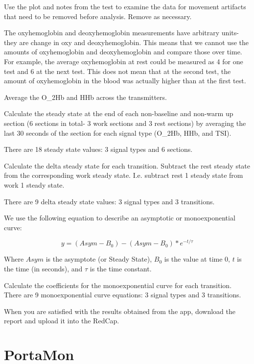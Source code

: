\documentclass[
]{book}
\begin{document}
Use the plot and notes from the test to examine the data for movement artifacts that need to be removed before analysis. Remove as necessary.

The oxyhemoglobin and deoxyhemoglobin measurements have arbitrary units- they are change in oxy and deoxyhemoglobin. This means that we cannot use the amounts of oxyhemoglobin and deoxyhemoglobin and compare those over time. For example, the average oxyhemoglobin at rest could be measured as 4 for one test and 6 at the next test. This does not mean that at the second test, the amount of oxyhemoglobin in the blood was actually higher than at the first test.

Average the O\_2Hb and HHb across the transmitters.

Calculate the steady state at the end of each non-baseline and non-warm up section (6 sections in total- 3 work sections and 3 rest sections) by averaging the last 30 seconds of the section for each signal type (O\_2Hb, HHb, and TSI).

There are 18 steady state values: 3 signal types and 6 sections.

Calculate the delta steady state for each transition.
Subtract the rest steady state from the corresponding work steady state. I.e. subtract rest 1 steady state from work 1 steady state.

There are 9 delta steady state values: 3 signal types and 3 transitions.

We use the following equation to describe an asymptotic or monoexponential curve:

\[y =({Asym}-B_0) - ({Asym}-B_0)*e^{-t/ \tau} \]

Where \({Asym}\) is the asymptote (or Steady State), \(B_0\) is the value at time 0, \(t\) is the time (in seconds), and \(\tau\) is the time constant.

Calculate the coefficients for the monoexponential curve for each transition. There are 9 monoexponential curve equations: 3 signal types and 3 transitions.

When you are satisfied with the results obtained from the app, download the report and upload it into the RedCap.

\hypertarget{appendix-appendix}{%
\appendix}


\hypertarget{PortaMon}{%
\chapter{PortaMon}\label{PortaMon}}
\end{document}
